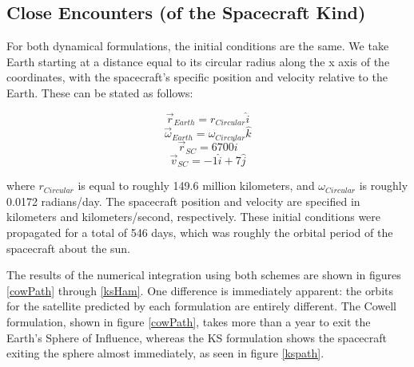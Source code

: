 \documentclass[11pt,twoside,letterpaper]{article}
\begin{document}
  \subsection {Close Encounters (of the Spacecraft Kind)}
  For both dynamical formulations, the initial conditions are the
  same. We take Earth starting at a distance equal to its circular
  radius along the x axis of the coordinates, with the spacecraft's
  specific position and velocity relative to the Earth. These can be
  stated as follows:

  \begin{equation} \label{ics}
    \vec{r}_{Earth} = r_{Circular}\hat{i}
  \end{equation}
  \begin{equation}
    \vec{\omega}_{Earth} = \omega_{Circular}\hat{k}
  \end{equation}
  \begin{equation}
    \vec{r}_{SC} = 6700\hat{i}
  \end{equation}
  \begin{equation}
    \vec{v}_{SC} = -1\hat{i} + 7\hat{j}
  \end{equation}

  where \(r_{Circular}\) is equal to roughly 149.6 million kilometers,
  and \(\omega_{Circular}\) is roughly 0.0172 radians/day. The
  spacecraft position and velocity are specified in kilometers and
  kilometers/second, respectively. These initial conditions were
  propagated for a total of 546 days, which was roughly the orbital
  period of the spacecraft about the sun. 

  The results of the numerical integration using both schemes are
  shown in figures \ref{cowPath} through \ref{ksHam}. One difference
  is immediately apparent: the orbits for the satellite predicted by
  each formulation are entirely different. The Cowell formulation,
  shown in figure \ref{cowPath}, takes more than a year to exit the
  Earth's Sphere of Influence, whereas the KS formulation shows the
  spacecraft exiting the sphere almost immediately, as seen in figure
  \ref{kspath}.
\end{document}
